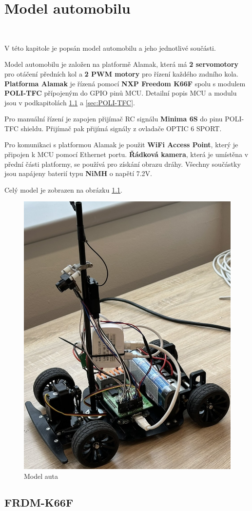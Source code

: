 \chapter{Model automobilu}
\label{sec:CarModel}
\vspace{-35pt}\


V této kapitole je popsán model automobilu a jeho jednotlivé součásti.

Model automobilu je založen na platformě Alamak, která má \textbf{2 servomotory}
pro otáčení předních kol a \textbf{2 PWM motory} pro řízení každého zadního kola.
\textbf{Platforma Alamak} je řízená pomocí \textbf{NXP Freedom K66F}\cite{frdmk66UserGuide} spolu s modulem \textbf{POLI-TFC} přípojeným do GPIO pinů
MCU. Detailní popis MCU a modulu jsou v podkapitolách \ref{sec:FRDM-K66F}
a \ref{sec:POLI-TFC}.

Pro manuální řízení je zapojen přijímač RC signálu \textbf{Minima 6S} do pinu
POLI-TFC shieldu. Přijímač pak přijímá signály z ovladače OPTIC 6 SPORT.

Pro komunikaci s platformou Alamak je použit \textbf{WiFi Access Point}, který je
připojen k MCU pomocí Ethernet portu. \textbf{Řádková kamera}, která je umístěna
v přední části platformy, se používá pro získání obrazu dráhy. Všechny součástky
jsou napájeny baterií typu \textbf{NiMH} o napětí 7.2V.

Celý model je zobrazen na obrázku \ref{fig:car}.
\begin{figure}[!h]
    \centering
    \includegraphics[width = .4\linewidth]{Figures/Car.jpeg}
    \caption{Model auta}
    \label{fig:car}
\end{figure}

\section{FRDM-K66F}
\label{sec:FRDM-K66F}\


